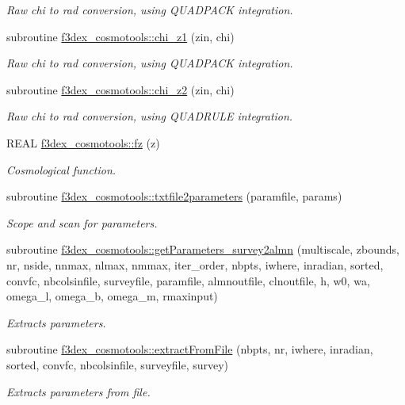 \begin{DoxyCompactItemize}
\begin{DoxyCompactList}\small\item\em Raw chi to rad conversion, using QUADPACK integration. \end{DoxyCompactList}\item 
subroutine \hyperlink{namespacef3dex__cosmotools_aae4fa92003adf2bfde48fa0dfcbf6b51}{f3dex\_\-cosmotools::chi\_\-z1} (zin, chi)
\begin{DoxyCompactList}\small\item\em Raw chi to rad conversion, using QUADPACK integration. \end{DoxyCompactList}\item 
subroutine \hyperlink{namespacef3dex__cosmotools_a6c29a874ae95da9fb207a2f63729eecf}{f3dex\_\-cosmotools::chi\_\-z2} (zin, chi)
\begin{DoxyCompactList}\small\item\em Raw chi to rad conversion, using QUADRULE integration. \end{DoxyCompactList}\item 
REAL \hyperlink{namespacef3dex__cosmotools_abba0e9b02d0f46a5abce5a0830da7f4d}{f3dex\_\-cosmotools::fz} (z)
\begin{DoxyCompactList}\small\item\em Cosmological function. \end{DoxyCompactList}\item 
subroutine \hyperlink{namespacef3dex__cosmotools_a609d3f29da9fc1be3bf27757e25532eb}{f3dex\_\-cosmotools::txtfile2parameters} (paramfile, params)
\begin{DoxyCompactList}\small\item\em Scope and scan for parameters. \end{DoxyCompactList}\item 
subroutine \hyperlink{namespacef3dex__cosmotools_a8405dbd12e86a408520f40f1b0a68919}{f3dex\_\-cosmotools::getParameters\_\-survey2almn} (multiscale, zbounds, nr, nside, nnmax, nlmax, nmmax, iter\_\-order, nbpts, iwhere, inradian, sorted, convfc, nbcolsinfile, surveyfile, paramfile, almnoutfile, clnoutfile, h, w0, wa, omega\_\-l, omega\_\-b, omega\_\-m, rmaxinput)
\begin{DoxyCompactList}\small\item\em Extracts parameters. \end{DoxyCompactList}\item 
subroutine \hyperlink{namespacef3dex__cosmotools_aaef3c07f112a83e6ff7a2762d5202fae}{f3dex\_\-cosmotools::extractFromFile} (nbpts, nr, iwhere, inradian, sorted, convfc, nbcolsinfile, surveyfile, survey)
\begin{DoxyCompactList}\small\item\em Extracts parameters from file. \end{DoxyCompactList}\end{DoxyCompactItemize}
